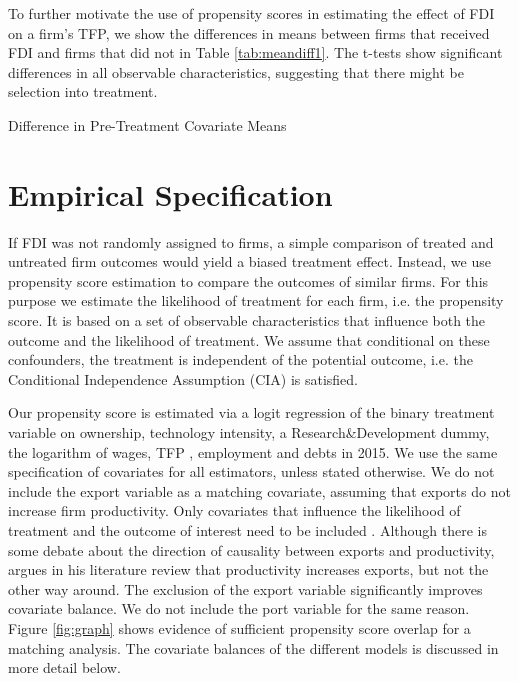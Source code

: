 \documentclass[a4paper,11pt]{scrartcl}
\begin{document}
To further motivate the use of propensity scores in estimating the effect of FDI on a firm's TFP, we show the differences in means between  firms that received FDI and firms that did not in Table \ref{tab:meandiff1}. The t-tests show significant differences in all observable characteristics, suggesting that there might be selection into treatment. 


\begin{table}[h!]
	\centering
	\caption{Difference in Pre-Treatment Covariate Means}
	\makebox[\textwidth]{
	}
	\label{tab:meandiff1}
\end{table}


\section{Empirical Specification}

If FDI was not randomly assigned to firms, a simple comparison of treated and untreated firm outcomes would yield a biased treatment effect.
Instead, we use propensity score estimation to compare the outcomes of similar firms. For this purpose we estimate the likelihood of treatment for each firm, i.e. the propensity score. It is based on a set of observable characteristics that influence both the outcome and the likelihood of treatment. We assume that conditional on these confounders, the treatment is independent of the potential outcome, i.e. the Conditional Independence Assumption (CIA) is satisfied. 

Our propensity score is estimated via a logit regression of the binary treatment variable on ownership, technology intensity, a Research\&Development dummy, the logarithm of wages, TFP , employment and debts in 2015. We use the same specification of covariates for all estimators, unless stated otherwise. We do not include the export variable as a matching covariate, assuming that exports do not increase firm productivity.
Only covariates that influence the likelihood of treatment and the outcome of interest need to be included \citep{Caliendo2008}.
Although there is some debate about the direction of causality between exports and productivity, \citet{wagner2007} argues in his literature review that productivity increases exports, but not the other way around. The exclusion of the export variable significantly improves covariate balance. We do not include the port variable for the same reason.
Figure \ref{fig:graph} shows evidence of sufficient propensity score overlap for a matching analysis. The covariate balances of the different models is discussed in more detail below.
\end{document}
